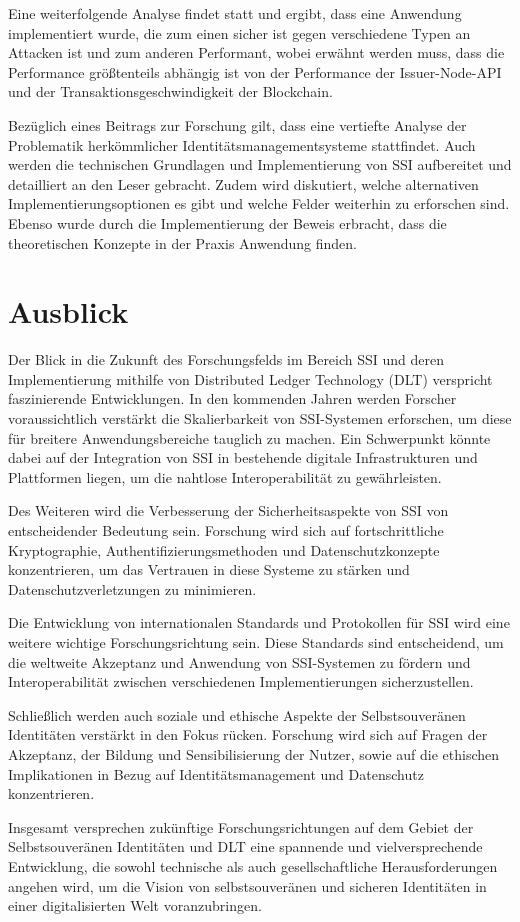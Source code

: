 Eine weiterfolgende Analyse findet statt und ergibt, dass eine Anwendung implementiert wurde, die zum einen sicher ist gegen verschiedene Typen an Attacken ist und zum anderen Performant, wobei erwähnt werden muss, dass die Performance größtenteils abhängig ist von der Performance der Issuer-Node-API und der Transaktionsgeschwindigkeit der Blockchain.

Bezüglich eines Beitrags zur Forschung gilt, dass eine vertiefte Analyse der Problematik herkömmlicher Identitätsmanagementsysteme stattfindet. Auch werden die technischen Grundlagen und Implementierung von SSI aufbereitet und detailliert an den Leser gebracht. Zudem wird diskutiert, welche alternativen Implementierungsoptionen es gibt und welche Felder weiterhin zu erforschen sind. Ebenso wurde durch die Implementierung der Beweis erbracht, dass die theoretischen Konzepte in der Praxis Anwendung finden.


\section{Ausblick}
Der Blick in die Zukunft des Forschungsfelds im Bereich SSI und deren Implementierung mithilfe von Distributed Ledger Technology (DLT) verspricht faszinierende Entwicklungen. In den kommenden Jahren werden Forscher voraussichtlich verstärkt die Skalierbarkeit von SSI-Systemen erforschen, um diese für breitere Anwendungsbereiche tauglich zu machen. Ein Schwerpunkt könnte dabei auf der Integration von SSI in bestehende digitale Infrastrukturen und Plattformen liegen, um die nahtlose Interoperabilität zu gewährleisten.

Des Weiteren wird die Verbesserung der Sicherheitsaspekte von SSI von entscheidender Bedeutung sein. Forschung wird sich auf fortschrittliche Kryptographie, Authentifizierungsmethoden und Datenschutzkonzepte konzentrieren, um das Vertrauen in diese Systeme zu stärken und Datenschutzverletzungen zu minimieren.

Die Entwicklung von internationalen Standards und Protokollen für SSI wird eine weitere wichtige Forschungsrichtung sein. Diese Standards sind entscheidend, um die weltweite Akzeptanz und Anwendung von SSI-Systemen zu fördern und Interoperabilität zwischen verschiedenen Implementierungen sicherzustellen.

Schließlich werden auch soziale und ethische Aspekte der Selbstsouveränen Identitäten verstärkt in den Fokus rücken. Forschung wird sich auf Fragen der Akzeptanz, der Bildung und Sensibilisierung der Nutzer, sowie auf die ethischen Implikationen in Bezug auf Identitätsmanagement und Datenschutz konzentrieren.

Insgesamt versprechen zukünftige Forschungsrichtungen auf dem Gebiet der Selbstsouveränen Identitäten und DLT eine spannende und vielversprechende Entwicklung, die sowohl technische als auch gesellschaftliche Herausforderungen angehen wird, um die Vision von selbstsouveränen und sicheren Identitäten in einer digitalisierten Welt voranzubringen.

